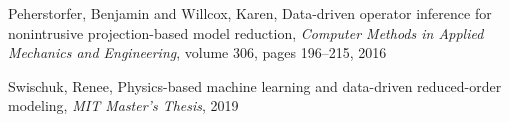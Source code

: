 \documentclass[11pt]{article} %
\newcommand{\code}[1]{\colorbox{light-gray}{\texttt{#1}}}
\begin{document}
%
%	
%
%

\begin{thebibliography}{1}
 Peherstorfer, Benjamin and Willcox, Karen, Data-driven operator inference for nonintrusive projection-based model reduction, \textit{Computer Methods in Applied Mechanics and Engineering}, volume 306, pages 196--215, 2016

Swischuk, Renee, Physics-based machine learning and data-driven reduced-order modeling, \textit{MIT Master's Thesis}, 2019

\end{thebibliography}
\end{document}
